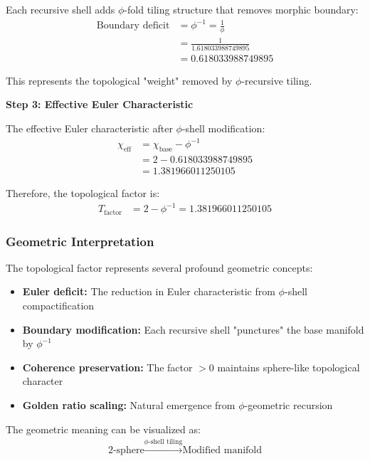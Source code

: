 Each recursive shell adds $\phi$-fold tiling structure that removes morphic boundary:
\begin{align}
\text{Boundary deficit} &= \phi^{-1} = \frac{1}{\phi} \tag{Morphic boundary removal}\\
&= \frac{1}{1.618033988749895} \\
&= 0.618033988749895
\end{align}

This represents the topological "weight" removed by $\phi$-recursive tiling.

\textbf{Step 3: Effective Euler Characteristic}

The effective Euler characteristic after $\phi$-shell modification:
\begin{align}
\chi_{\text{eff}} &= \chi_{\text{base}} - \phi^{-1} \\
&= 2 - 0.618033988749895 \\
&= 1.381966011250105
\end{align}

Therefore, the topological factor is:
\begin{align}
T_{\text{factor}} &= 2 - \phi^{-1} = 1.381966011250105 \tag{Exact result}
\end{align}

\subsubsection{Geometric Interpretation}

The topological factor represents several profound geometric concepts:

\begin{itemize}
\item \textbf{Euler deficit:} The reduction in Euler characteristic from $\phi$-shell compactification
\item \textbf{Boundary modification:} Each recursive shell "punctures" the base manifold by $\phi^{-1}$  
\item \textbf{Coherence preservation:} The factor $> 0$ maintains sphere-like topological character
\item \textbf{Golden ratio scaling:} Natural emergence from $\phi$-geometric recursion
\end{itemize}

The geometric meaning can be visualized as:
\begin{align}
\text{2-sphere} \xrightarrow{\phi\text{-shell tiling}} \text{Modified manifold} \tag{Topological evolution}
\end{align}

